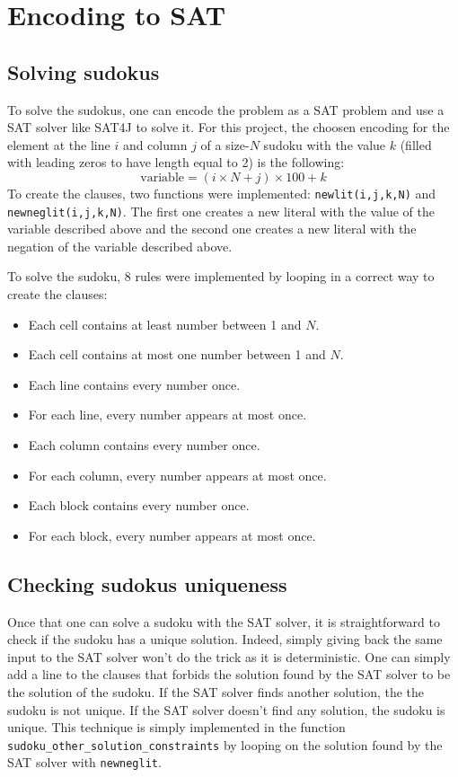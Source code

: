 \section{Encoding to SAT}
\subsection{Solving sudokus}
To solve the sudokus, one can encode the problem as a SAT problem and use a SAT solver like SAT4J to solve it. 
For this project, the choosen encoding for the element at the line $i$ and column $j$ of a size-$N$ sudoku with the value $k$ (filled with leading zeros to have length equal to 2) is the following:
$$ \text{variable} = (i \times N + j) \times 100 + k $$
To create the clauses, two functions were implemented: \verb|newlit(i,j,k,N)| and \verb|newneglit(i,j,k,N)|. The first one creates a new literal with the value of the variable described above and the second one creates a new literal with the negation of the variable described above.

To solve the sudoku, 8 rules were implemented by looping in a correct way to create the clauses:

\begin{itemize}
  \item Each cell contains at least number between 1 and $N$.
  \item Each cell contains at most one number between 1 and $N$.
  \item Each line contains every number once.
  \item For each line, every number appears at most once.
  \item Each column contains every number once.
  \item For each column, every number appears at most once.
  \item Each block contains every number once.
  \item For each block, every number appears at most once.
\end{itemize}

\subsection{Checking sudokus uniqueness}
Once that one can solve a sudoku with the SAT solver, it is straightforward to check if the sudoku has a unique solution. Indeed, simply giving back the same input to the SAT solver won't do the trick as it is deterministic.
One can simply add a line to the clauses that forbids the solution found by the SAT solver to be the solution of the sudoku. If the SAT solver finds another solution, the the sudoku is not unique. If the SAT solver doesn't find any solution, the sudoku is unique.
This technique is simply implemented in the function \verb|sudoku_other_solution_constraints| by looping on the solution found by the SAT solver with \verb|newneglit|.


